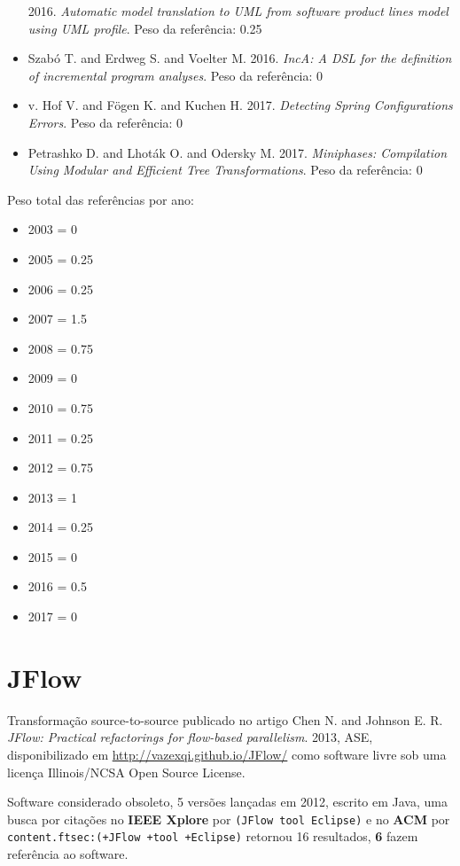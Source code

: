 \begin{itemize}
      2016.
      {\it Automatic model translation to UML from software product lines model using UML profile}.
      Peso da referência: 0.25
\item Szabó T. and Erdweg S. and Voelter M.
      2016.
      {\it IncA: A DSL for the definition of incremental program analyses}.
      Peso da referência: 0
\item v. Hof V. and F\"{o}gen K. and Kuchen H.
      2017.
      {\it Detecting Spring Configurations Errors}.
      Peso da referência: 0
\item Petrashko D. and Lhot\'{a}k O. and Odersky M.
      2017.
      {\it Miniphases: Compilation Using Modular and Efficient Tree Transformations}.
      Peso da referência: 0
\end{itemize}

Peso total das referências por ano:

\begin{itemize}
\item 2003 = 0
\item 2005 = 0.25
\item 2006 = 0.25
\item 2007 = 1.5
\item 2008 = 0.75
\item 2009 = 0
\item 2010 = 0.75
\item 2011 = 0.25
\item 2012 = 0.75
\item 2013 = 1
\item 2014 = 0.25
\item 2015 = 0
\item 2016 = 0.5
\item 2017 = 0
\end{itemize}


\section{JFlow}

Transformação source-to-source
publicado no artigo
Chen N. and Johnson E. R.
{\it JFlow: Practical refactorings for flow-based parallelism}.
2013,
ASE,
disponibilizado em \url{http://vazexqi.github.io/JFlow/}
como software livre
sob uma licença Illinois/NCSA Open Source License.

Software considerado obsoleto,
5 versões lançadas
em 2012,
escrito em Java,
uma busca por citações no {\bf IEEE Xplore} por
\texttt{(JFlow tool Eclipse)}
e no {\bf ACM} por
\texttt{content.ftsec:(+JFlow +tool +Eclipse)}
retornou
16 resultados,
{\bf 6} fazem referência ao software.


